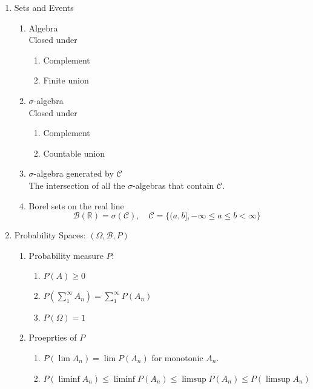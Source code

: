 \documentclass{article}
\newcommand{\mc}[1]{\mathcal{#1}}
\newcommand{\mb}[1]{\mathbb{#1}}
\begin{document}
\begin{enumerate}
\item Sets and Events
  \begin{enumerate}
  \item Algebra \\
    Closed under
    \begin{enumerate}
    \item Complement
    \item Finite union
    \end{enumerate}
  \item $\sigma$-algebra \\
    Closed under
    \begin{enumerate}
    \item Complement
    \item Countable union
    \end{enumerate}
  \item $\sigma$-algebra generated by $\mc{C}$ \\
    The intersection of all the $\sigma$-algebras that contain
    $\mc{C}$.
  \item Borel sets on the real line \\
    \[
      \mc{B}(\mb{R}) = \sigma(\mc{C}), \quad \mc{C} = \{(a,b], -\infty
      \leq a \leq b < \infty\}
    \]
  \end{enumerate}
  \item Probability Spaces: $(\Omega, \mc{B}, P)$
    \begin{enumerate}
    \item Probability measure $P$:
      \begin{enumerate}
      \item $P(A) \geq 0$ \\
      \item $P(\sum_1^\infty A_n) = \sum_1^\infty P(A_n)$ \\
      \item $P(\Omega) = 1$ \\
      \end{enumerate}
    \item Proeprties of $P$
      \begin{enumerate}
      \item $P(\lim A_n) = \lim P(A_n)$ for monotonic $A_n$.
      \item $P(\liminf A_n) \leq \liminf P(A_n) \leq \limsup P(A_n) \leq P(\limsup A_n)$
    \end{enumerate}
  \end{enumerate}

\end{enumerate}
\end{document}
